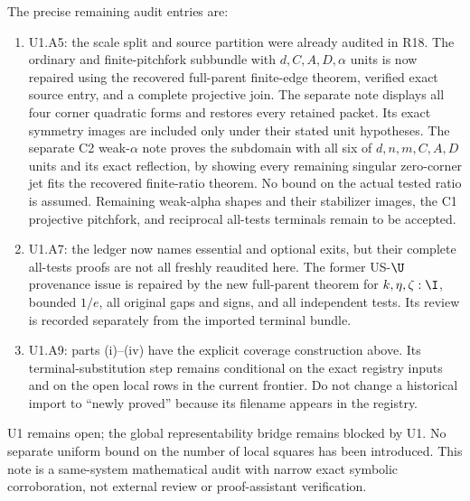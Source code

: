 The precise remaining audit entries are:
\begin{enumerate}
\item U1.A5: the scale split and source partition were already audited
in R18. The ordinary and finite-pitchfork subbundle with
$d,C,A,D,\alpha$ units is now repaired using the recovered full-parent
finite-edge theorem, verified exact source entry, and a complete
projective join. The separate note displays all four corner quadratic
forms and restores every retained packet. Its exact symmetry images
are included only under their stated unit hypotheses. The separate C2
weak-$\alpha$ note proves the subdomain with all six of
$d,n,m,C,A,D$ units and its exact reflection, by showing every
remaining singular zero-corner jet fits the recovered finite-ratio
theorem. No bound on the actual tested ratio is assumed. Remaining
weak-alpha shapes and their stabilizer images, the C1 projective
pitchfork, and reciprocal all-tests terminals remain to be accepted.
\item U1.A7: the ledger now names essential and optional exits, but
their complete all-tests proofs are not all freshly reaudited here.
The former US-$\U$ provenance issue is repaired by the new full-parent
theorem for $k,\eta,\zeta:\I$, bounded $1/e$, all original gaps and
signs, and all independent tests. Its review is recorded separately
from the imported terminal bundle.
\item U1.A9: parts (i)--(iv) have the explicit coverage construction
above. Its terminal-substitution step remains conditional on the exact
registry inputs and on the open local rows in the
current frontier. Do not change a historical import to ``newly proved''
because its filename appears in the registry.
\end{enumerate}
U1 remains open; the global representability bridge remains blocked by
U1. No separate uniform bound on the number of local squares has been
introduced. This note is a same-system mathematical audit with narrow
exact symbolic corroboration, not external review or proof-assistant
verification.
